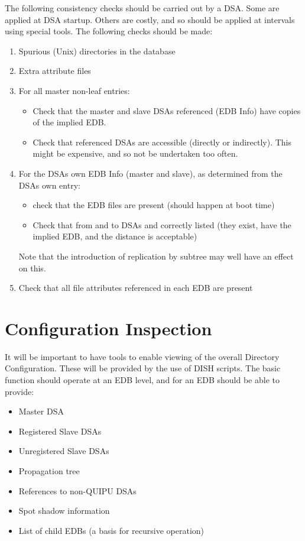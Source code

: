 The following consistency checks should be carried out by a DSA.
Some are applied at DSA startup.  Others are costly, and so should be
applied at intervals using special tools.
The following checks should be made:

\begin {enumerate}
\item Spurious (Unix) directories in the database
\item Extra attribute files

\item For all master non-leaf entries:
\begin {itemize}
\item
Check that the master and slave DSAs
referenced (EDB Info) have copies of the implied EDB.
\item Check that referenced DSAs are accessible (directly or indirectly).
This might be expensive, and so not be undertaken too often.
\end {itemize}


\item For the DSAs own EDB Info (master and slave), as determined from the
DSAs own entry:
\begin {itemize}
\item
check that the EDB files
are present (should happen at boot time)
\item Check that from and to DSAs and correctly listed (they exist, have the
implied EDB, and the distance is acceptable)
\end {itemize}

Note that the introduction of replication by subtree may well have an effect
on this.

\item Check that all file attributes referenced in each EDB  are present


\end {enumerate}

\section {Configuration Inspection}

It will be important to have tools to enable viewing of the overall
Directory Configuration.  These will be provided by the use of DISH scripts.
The basic function should operate at an EDB level, and for an EDB should be
able to provide:

\begin {itemize}
\item Master DSA
\item Registered Slave DSAs
\item Unregistered Slave DSAs
\item Propagation tree 
\item References to non-QUIPU DSAs
\item Spot shadow information 
\item List of child EDBs (a basis for recursive operation)
\end {itemize}

